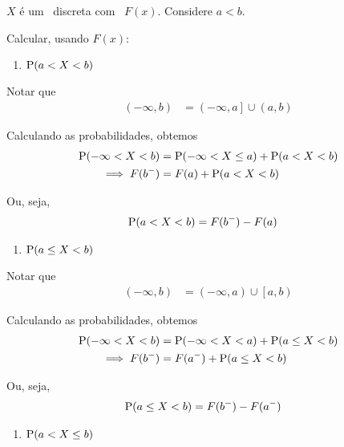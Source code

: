 \begin{example}
    $X$ é um \va\ discreta com \fda\ $F(x)$. Considere $a < b$.

    Calcular, usando $F(x)$:
    
    \begin{enumerate}
        \item $\operatorname{P}(a < X < b)$
    \end{enumerate}

    Notar que
    \begin{align*}
        \left(-\infty, b\right)
        &= \left(-\infty, a\right] \cup \left(a, b\right)
    \end{align*}

    Calculando as probabilidades, obtemos
    \begin{align*}
        \operatorname{P}(-\infty < X < b)
        &= \operatorname{P}(-\infty < X \leq a)
        + \operatorname{P}(a < X < b) \\
        \implies F(b^-) &= F(a) + \operatorname{P}(a < X < b)
    \end{align*}
    
    Ou, seja,
    \begin{align*}
        \operatorname{P}(a < X < b) &= F(b^-) - F(a)
    \end{align*}
    
    \begin{enumerate}[resume]
        \item $\operatorname{P}(a \leq X < b)$
    \end{enumerate}

    Notar que
    \begin{align*}
        \left(-\infty, b\right)
        &= \left(-\infty, a\right) \cup \left[a, b\right)
    \end{align*}

    Calculando as probabilidades, obtemos
    \begin{align*}
        \operatorname{P}(-\infty < X < b)
        &= \operatorname{P}(-\infty < X < a)
        + \operatorname{P}(a \leq X < b) \\
        \implies F(b^-) &= F(a^-) + \operatorname{P}(a \leq X < b)
    \end{align*}
    
    Ou, seja,
    \begin{align*}
        \operatorname{P}(a \leq X < b) &= F(b^-) - F(a^-)
    \end{align*}
    
    \begin{enumerate}[resume]
        \item $\operatorname{P}(a < X \leq b)$
    \end{enumerate}


\end{example}
